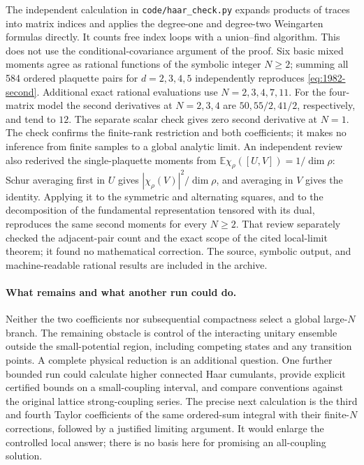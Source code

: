 \begin{remark}
The independent calculation in \nolinkurl{code/haar_check.py} expands products of traces
into matrix indices and applies the degree-one and degree-two Weingarten
formulas directly. It counts free index loops with a union--find algorithm.
This does not use the conditional-covariance argument of the proof. Six
basic mixed moments agree as rational functions of the symbolic integer
\(N\geq2\); summing all 584 ordered plaquette pairs for
\(d=2,3,4,5\) independently reproduces \eqref{eq:1982-second}.
Additional exact rational evaluations use \(N=2,3,4,7,11\).
For the four-matrix model the second derivatives at \(N=2,3,4\) are
\(50,55/2,41/2\), respectively, and tend to \(12\).
The separate scalar check gives zero second derivative at \(N=1\).
The check confirms the finite-rank restriction and both coefficients;
it makes no inference from finite samples to a global analytic limit.
An independent review also rederived the single-plaquette moments from
\(\mathbb E\chi_\rho([U,V])=1/\dim\rho\): Schur averaging first in
\(U\) gives \(|\chi_\rho(V)|^2/\dim\rho\), and averaging in \(V\)
gives the identity. Applying it to the symmetric and alternating squares,
and to the decomposition of the fundamental representation tensored with
its dual, reproduces the same second moments for every \(N\geq2\).
That review separately checked the adjacent-pair count and the exact scope
of the cited local-limit theorem; it found no mathematical correction.
The source, symbolic output, and machine-readable rational results are
included in the archive.
\end{remark}

\paragraph{What remains and what another run could do.}
Neither the two coefficients nor subsequential compactness select a global
large-\(N\) branch. The remaining obstacle is control of the interacting
unitary ensemble outside the small-potential region, including competing
states and any transition points. A complete physical reduction is an
additional question. One further bounded run could calculate higher connected
Haar cumulants, provide explicit certified bounds on a small-coupling interval,
and compare conventions against the original lattice strong-coupling series.
The precise next calculation is the third and fourth Taylor coefficients of
the same ordered-sum integral with their finite-\(N\) corrections, followed by
a justified limiting argument. It would enlarge the controlled local answer;
there is no basis here for promising an all-coupling solution.
